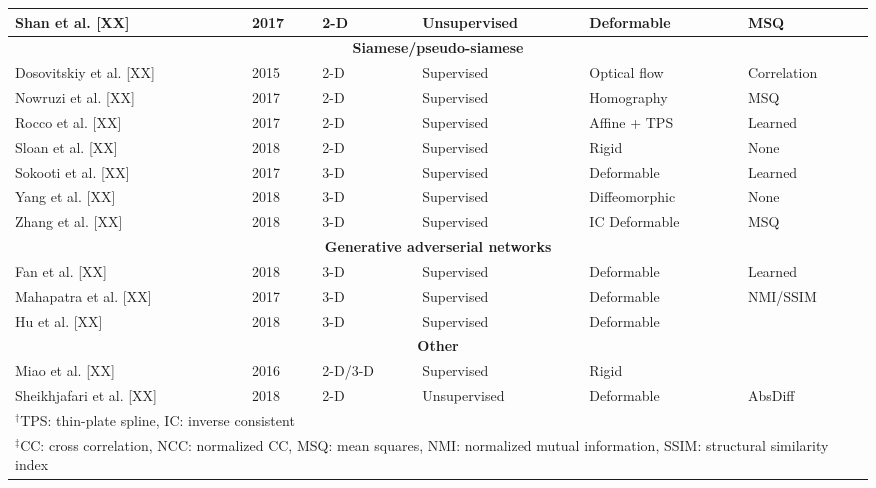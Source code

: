 \begin{table}[!htb]
\begin{tabular*}{\textwidth}{l@{\extracolsep{\fill}}l@{\extracolsep{\fill}}l@{\extracolsep{\fill}}l@{\extracolsep{\fill}}l@{\extracolsep{\fill}}l}
  Shan et al. [XX] & 2017 & 2-D & Unsupervised & Deformable & MSQ \\
\midrule
\multicolumn{6}{c}{\textbf{Siamese/pseudo-siamese}}
  \vspace{0.25cm} \\
  Dosovitskiy et al. [XX] & 2015 & 2-D & Supervised & Optical flow & Correlation \\
  Nowruzi et al. [XX] & 2017 & 2-D & Supervised & Homography & MSQ \\
  Rocco et al. [XX] & 2017 & 2-D & Supervised & Affine + TPS & Learned \\
  Sloan et al. [XX] & 2018 & 2-D & Supervised & Rigid & None \\  %
  Sokooti et al. [XX] & 2017 & 3-D & Supervised & Deformable & Learned \\
  Yang et al. [XX] & 2018 & 3-D & Supervised & Diffeomorphic & None \\  %
  Zhang et al. [XX] & 2018 & 3-D & Supervised & IC Deformable & MSQ \\
\midrule
\multicolumn{6}{c}{\textbf{Generative adverserial networks}}
  \vspace{0.25cm} \\
  Fan et al. [XX] & 2018 & 3-D & Supervised & Deformable & Learned \\
  Mahapatra et al. [XX] & 2017 & 3-D & Supervised & Deformable & NMI/SSIM \\
  Hu et al. [XX] & 2018 & 3-D & Supervised & Deformable & {} \\
\midrule
\multicolumn{6}{c}{\textbf{Other}}
  \vspace{0.25cm} \\
  Miao et al. [XX] & 2016 & 2-D/3-D & Supervised & Rigid & {} \\
  Sheikhjafari et al. [XX] & 2018 & 2-D & Unsupervised & Deformable & AbsDiff \\
\bottomrule
\multicolumn{6}{l}{
  \begin{minipage}[t]{0.9\columnwidth}%
    \footnotesize{$^\dagger$TPS: thin-plate spline, IC: inverse consistent}
  \end{minipage}
  } \\
\multicolumn{6}{l}{
  \begin{minipage}[t]{0.9\columnwidth}%
    \footnotesize{$^\ddagger$CC: cross correlation, NCC: normalized CC, MSQ: mean squares,
      NMI:  normalized mutual information, SSIM:  structural similarity index}
  \end{minipage}
  }
\end{tabular*}
\end{table}


